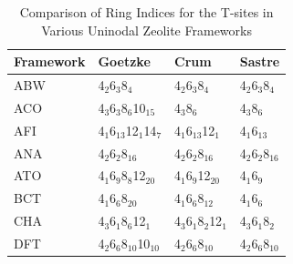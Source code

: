 \documentclass[11pt]{article}
\begin{document}
\begin{table}[htbp]
\caption{Comparison of Ring Indices for the T-sites in Various Uninodal Zeolite Frameworks \label{tab:ring-counts}}
\centering
\begin{tabular}{llll}
Framework & Goetzke & Crum & Sastre \cite{sastre-topological-2009}\\
\hline
ABW & 4\(_{\text{2}}\)\textbullet{}6\(_{\text{3}}\)\textbullet{}8\(_{\text{4}}\) & 4\(_{\text{2}}\)\textbullet{}6\(_{\text{3}}\)\textbullet{}8\(_{\text{4}}\) & 4\(_{\text{2}}\)\textbullet{}6\(_{\text{3}}\)\textbullet{}8\(_{\text{4}}\)\\
ACO & 4\(_{\text{3}}\)\textbullet{}6\(_{\text{3}}\)\textbullet{}8\(_{\text{6}}\)\textbullet{}10\(_{\text{15}}\) & 4\(_{\text{3}}\)\textbullet{}8\(_{\text{6}}\) & 4\(_{\text{3}}\)\textbullet{}8\(_{\text{6}}\)\\
AFI & 4\(_{\text{1}}\)\textbullet{}6\(_{\text{13}}\)\textbullet{}12\(_{\text{1}}\)\textbullet{}14\(_{\text{7}}\) & 4\(_{\text{1}}\)\textbullet{}6\(_{\text{13}}\)\textbullet{}12\(_{\text{1}}\) & 4\(_{\text{1}}\)\textbullet{}6\(_{\text{13}}\)\\
ANA & 4\(_{\text{2}}\)\textbullet{}6\(_{\text{2}}\)\textbullet{}8\(_{\text{16}}\) & 4\(_{\text{2}}\)\textbullet{}6\(_{\text{2}}\)\textbullet{}8\(_{\text{16}}\) & 4\(_{\text{2}}\)\textbullet{}6\(_{\text{2}}\)\textbullet{}8\(_{\text{16}}\)\\
ATO & 4\(_{\text{1}}\)\textbullet{}6\(_{\text{9}}\)\textbullet{}8\(_{\text{8}}\)\textbullet{}12\(_{\text{20}}\) & 4\(_{\text{1}}\)\textbullet{}6\(_{\text{9}}\)\textbullet{}12\(_{\text{20}}\) & 4\(_{\text{1}}\)\textbullet{}6\(_{\text{9}}\)\\
BCT & 4\(_{\text{1}}\)\textbullet{}6\(_{\text{6}}\)\textbullet{}8\(_{\text{20}}\) & 4\(_{\text{1}}\)\textbullet{}6\(_{\text{6}}\)\textbullet{}8\(_{\text{12}}\) & 4\(_{\text{1}}\)\textbullet{}6\(_{\text{6}}\)\\
CHA & 4\(_{\text{3}}\)\textbullet{}6\(_{\text{1}}\)\textbullet{}8\(_{\text{6}}\)\textbullet{}12\(_{\text{1}}\) & 4\(_{\text{3}}\)\textbullet{}6\(_{\text{1}}\)\textbullet{}8\(_{\text{2}}\)\textbullet{}12\(_{\text{1}}\) & 4\(_{\text{3}}\)\textbullet{}6\(_{\text{1}}\)\textbullet{}8\(_{\text{2}}\)\\
DFT & 4\(_{\text{2}}\)\textbullet{}6\(_{\text{6}}\)\textbullet{}8\(_{\text{10}}\)\textbullet{}10\(_{\text{10}}\) & 4\(_{\text{2}}\)\textbullet{}6\(_{\text{6}}\)\textbullet{}8\(_{\text{10}}\) & 4\(_{\text{2}}\)\textbullet{}6\(_{\text{6}}\)\textbullet{}8\(_{\text{10}}\)\\

\end{tabular}
\end{table}
\end{document}
